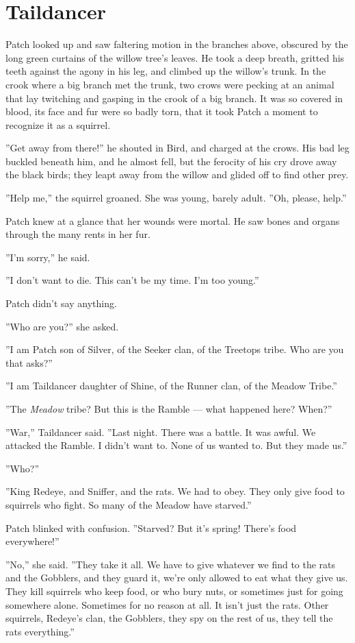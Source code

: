 \documentclass[12pt]{book}
\begin{document}

\section{Taildancer}

Patch looked up and saw faltering motion in the branches above, obscured by the long green curtains of the willow tree's leaves. He took a deep breath, gritted his teeth against the agony in his leg, and climbed up the willow's trunk. In the crook where a big branch met the trunk, two crows were pecking at an animal that lay twitching and gasping in the crook of a big branch. It was so covered in blood, its face and fur were so badly torn, that it took Patch a moment to recognize it as a squirrel.

''Get away from there!'' he shouted in Bird, and charged at the crows. His bad leg buckled beneath him, and he almost fell, but the ferocity of his cry drove away the black birds; they leapt away from the willow and glided off to find other prey.

''Help me,'' the squirrel groaned. She was young, barely adult. ''Oh, please, help.''

Patch knew at a glance that her wounds were mortal. He saw bones and organs through the many rents in her fur.

''I'm sorry,'' he said.

''I don't want to die. This can't be my time. I'm too young.''

Patch didn't say anything.

''Who are you?'' she asked.

''I am Patch son of Silver, of the Seeker clan, of the Treetops tribe. Who are you that asks?''

''I am Taildancer daughter of Shine, of the Runner clan, of the Meadow Tribe.''

''The {\it Meadow} tribe? But this is the Ramble ---
what happened here? When?''

''War,'' Taildancer said. ''Last night. There was a battle. It was awful. We attacked the Ramble. I didn't want to. None of us wanted to. But they made us.''

''Who?''

''King Redeye, and Sniffer, and the rats. We had to obey. They only give food to squirrels who fight. So many of the Meadow have starved.''

Patch blinked with confusion. ''Starved? But it's spring! There's food everywhere!''

''No,'' she said. ''They take it all. We have to give whatever we find to the rats and the Gobblers, and they guard it, we're only allowed to eat what they give us. They kill squirrels who keep food, or who bury nuts, or sometimes just for going somewhere alone. Sometimes for no reason at all. It isn't just the rats. Other squirrels, Redeye's clan, the Gobblers, they spy on the rest of us, they tell the rats everything.''
\end{document}
